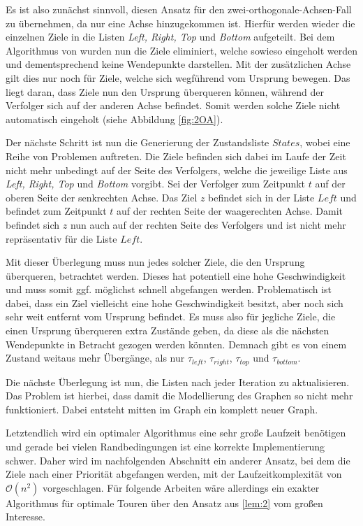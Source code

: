 \documentclass[german,version-2019-11]{uzl-thesis}
\begin{document}
Es ist also zunächst sinnvoll, diesen Ansatz für den zwei-orthogonale-Achsen-Fall zu übernehmen, da nur eine Achse hinzugekommen ist. Hierfür werden wieder die einzelnen Ziele in die Listen \emph{Left, Right, Top} und \emph{Bottom} aufgeteilt. Bei dem Algorithmus von \cite{helvig} wurden nun die Ziele eliminiert, welche sowieso eingeholt werden und dementsprechend keine Wendepunkte darstellen. Mit der zusätzlichen Achse gilt dies nur noch für Ziele, welche sich wegführend vom Ursprung bewegen. Das liegt daran, dass Ziele nun den Ursprung überqueren können, während der Verfolger sich auf der anderen Achse befindet. Somit werden solche Ziele nicht automatisch eingeholt (siehe Abbildung \ref{fig:2OA}).

Der nächste Schritt ist nun die Generierung der Zustandsliste $States$, wobei eine Reihe von Problemen auftreten. Die Ziele befinden sich dabei im Laufe der Zeit nicht mehr unbedingt auf der Seite des Verfolgers, welche die jeweilige Liste aus \emph{Left, Right, Top} und \emph{Bottom} vorgibt. Sei der Verfolger zum Zeitpunkt $t$ auf der oberen Seite der senkrechten Achse. Das Ziel $z$ befindet sich in der Liste $Left$ und befindet zum Zeitpunkt $t$ auf der rechten Seite der waagerechten Achse. Damit befindet sich $z$ nun auch auf der rechten Seite des Verfolgers und ist nicht mehr repräsentativ für die Liste $Left$. 

Mit dieser Überlegung muss nun jedes solcher Ziele, die den Ursprung überqueren, betrachtet werden. Dieses hat potentiell eine hohe Geschwindigkeit und muss somit ggf. möglichst schnell abgefangen werden. Problematisch ist dabei, dass ein Ziel vielleicht eine hohe Geschwindigkeit besitzt, aber noch sich sehr weit entfernt vom Ursprung befindet. Es muss also für jegliche Ziele, die einen Ursprung überqueren extra Zustände geben, da diese als die nächsten Wendepunkte in Betracht gezogen werden könnten. Demnach gibt es von einem Zustand weitaus mehr Übergänge, als nur $\tau_{left}$, $\tau_{right}$, $\tau_{top}$ und $\tau_{bottom}$. 

Die nächste Überlegung ist nun, die Listen nach jeder Iteration zu aktualisieren. Das Problem ist hierbei, dass damit die Modellierung des Graphen so nicht mehr funktioniert. Dabei entsteht mitten im Graph ein komplett neuer Graph. 
 
Letztendlich wird ein optimaler Algorithmus eine sehr große Laufzeit benötigen und gerade bei vielen Randbedingungen ist eine korrekte Implementierung schwer. Daher wird im nachfolgenden Abschnitt ein anderer Ansatz, bei dem die Ziele nach einer Priorität abgefangen werden, mit der Laufzeitkomplexität von $\mathcal{O}(n^2)$ vorgeschlagen. Für folgende Arbeiten wäre allerdings ein exakter Algorithmus für optimale Touren über den Ansatz aus \ref{lem:2} vom großen Interesse.
\end{document}
